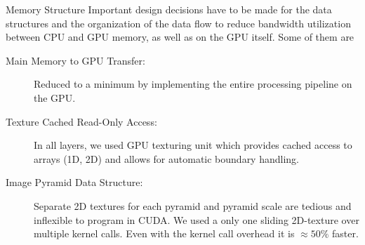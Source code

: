 \documentclass[final]{beamer}
\begin{document}
\begin{frame}{}
\begin{columns}[t]
      \begin{column}{.48\linewidth}
        \begin{block}{Memory Structure}
          Important design decisions have to be made for the data structures and
the organization of the data flow to reduce bandwidth utilization
between CPU and GPU memory, as well as on the GPU itself. Some of them are
\begin{description}
\item[ Main Memory to GPU Transfer: ] 
Reduced to a minimum by implementing the entire processing pipeline on the GPU.\\
\item[ Texture Cached Read-Only Access:]
In all layers, we used GPU texturing unit which provides cached access to arrays (1D, 2D) and allows for automatic boundary handling.
\item [ Image Pyramid Data Structure:]
Separate 2D textures for each pyramid and pyramid scale are tedious and inflexible to program in CUDA.
We used a only one sliding 2D-texture over multiple kernel calls. Even with the kernel call overhead it is $\approx 50\%$ faster.
\newline
\end{description}
        \end{block}
				



\end{column}
\end{columns}
\end{frame}
\end{document}
